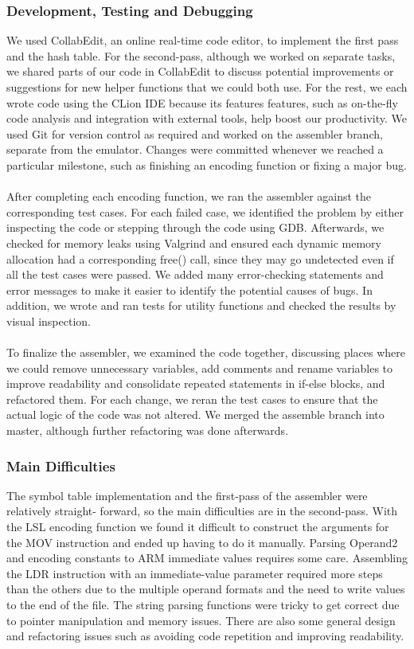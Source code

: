 \documentclass[11pt,twoside]{article}
\begin{document}
\subsubsection{Development, Testing and Debugging}
We used CollabEdit, an online real-time code editor, to implement the first pass and the hash table. For the second-pass, although we worked on separate tasks, we shared parts of our code in CollabEdit to discuss potential improvements or suggestions for new helper functions that we could both use. For the rest, we each wrote code using the CLion IDE because its features features, such as on-the-fly code analysis and integration with external tools, help boost our productivity. We used Git for version control as required and worked on the assembler branch, separate from the emulator. Changes were committed whenever we reached a particular milestone, such as finishing an encoding function or fixing a major bug.
\\\\
After completing each encoding function, we ran the assembler against the corresponding test cases. For each failed case, we identified the problem by either inspecting the code or stepping through the code using GDB. Afterwards, we checked for memory leaks using Valgrind and ensured each dynamic memory allocation had a corresponding free() call, since they may go undetected even if all the test cases were passed. We added many error-checking statements and error messages to make it easier to identify the potential causes of bugs. In addition, we wrote and ran tests for utility functions and checked the results by visual inspection.
\\\\
To finalize the assembler, we examined the code together, discussing places where we could remove unnecessary variables, add comments and rename variables to improve readability and consolidate repeated statements in if-else blocks, and refactored them. For each change, we reran the test cases to ensure that the actual logic of the code was not altered. We merged the assemble branch into master, although further refactoring was done afterwards.
\subsubsection{Main Difficulties}
The symbol table implementation and the first-pass of the assembler were relatively straight-
forward, so the main difficulties are in the second-pass. With the LSL encoding function we found it difficult to construct the arguments for the MOV instruction and ended up having to do it manually. Parsing Operand2 and encoding constants to ARM immediate values requires some care. Assembling the LDR instruction with an immediate-value parameter required more steps than the others due to the multiple operand formats and the need to write values to the end of the file. The string parsing functions were tricky to get correct  due to pointer manipulation and memory issues. There are also some general design and refactoring issues such as avoiding code repetition and improving readability.
\end{document}
